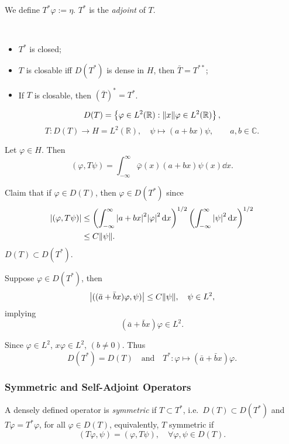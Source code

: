 \documentclass[a4paper,11pt]{article}
\begin{document}
	We define $T^* \varphi := \eta$. $T^*$ is the \emph{adjoint} of $T$.

	\begin{nt}
		\ 
		\begin{itemize}
			\item $T^*$ is closed;
			\item $T$ is closable iff $D(T^*)$ is dense in $H$, then $\bar T = T ^{**}$;
			\item If $T$ is closable, then $(\bar T)^* = T^*$.
		\end{itemize}
	\end{nt}

	\begin{ex}
		\[
			D(T) = \left\{ \varphi \in L^2(\mathbb{R}) : \norm{x}\varphi \in L^2(\mathbb{R}) \right\},
		\]
		\[
			T : D(T) \to H = L^2(\mathbb{R}), \quad \psi \mapsto (a + bx) \psi, \qquad a,b \in \mathbb{C}.
		\]
			 
		Let $\varphi \in H$. Then 
		\[
			(\varphi, T \psi) = \int_{- \infty}^{\infty} \bar{\varphi} (x) (a + bx) \psi(x) \dd{x}.
		\]
		
		Claim that if $\varphi \in D(T)$, then $\varphi \in D(T^*)$ since 
		\begin{align*}
			\abs{(\varphi, T \psi)} & \leq \left( \int_{-\infty}^{\infty} \abs{a + bx}^2 \abs{\varphi}^2 \dd{x} \right)^{1/2} \left( \int_{-\infty}^{\infty} \abs{\psi}^2 \dd{x} \right)^{1/2}\\
			& \leq C \norm{\psi}.
		\end{align*}
		$D(T) \subset D(T^*)$. 
		
		Suppose $\varphi \in D(T^*)$, then 
		\[
			\abs{((\bar a + \bar b x)\varphi, \psi)} \leq C \norm{\psi}, \quad \psi \in L^2,
		\]
		implying
		\[
			(\bar a + \bar b x) \varphi \in L^2.
		\]
		
		Since $\varphi \in L^2$, $x \varphi \in L^2$, $(b \neq 0)$. Thus 
		\[
			D(T^*) = D(T) \quad \text{and} \quad T^* : \varphi \mapsto (\bar a + \bar b x) \varphi.
		\]
	\end{ex}

	\subsubsection{Symmetric and Self-Adjoint Operators}

	A densely defined operator is \emph{symmetric} if $T \subset T^*$, i.e.\ $D(T) \subset D(T^*)$ and $T \varphi = T^* \varphi$, for all $\varphi \in D(T)$, equivalently, $T$ symmetric if 
	\[
		(T \varphi, \psi) = (\varphi, T \psi), \quad \forall \varphi, \psi \in D(T).
	\]
	
\end{document}
